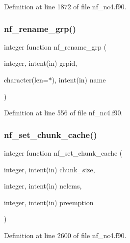 Definition at line 1872 of file nf\+\_\+nc4.\+f90.

\mbox{\label{nf__nc4_8f90_a64a1b89a08cbc89ad5360cfb2d17996c}} 
\subsubsection{\texorpdfstring{nf\+\_\+rename\+\_\+grp()}{nf\_rename\_grp()}}
{\footnotesize\ttfamily integer function nf\+\_\+rename\+\_\+grp (\begin{DoxyParamCaption}\item[{integer, intent(in)}]{grpid,  }\item[{character(len=$\ast$), intent(in)}]{name }\end{DoxyParamCaption})}



Definition at line 556 of file nf\+\_\+nc4.\+f90.

\mbox{\label{nf__nc4_8f90_a9aecb7b5d039a8ba5ad9ae15d7aedce3}} 
\subsubsection{\texorpdfstring{nf\+\_\+set\+\_\+chunk\+\_\+cache()}{nf\_set\_chunk\_cache()}}
{\footnotesize\ttfamily integer function nf\+\_\+set\+\_\+chunk\+\_\+cache (\begin{DoxyParamCaption}\item[{integer, intent(in)}]{chunk\+\_\+size,  }\item[{integer, intent(in)}]{nelems,  }\item[{integer, intent(in)}]{preemption }\end{DoxyParamCaption})}



Definition at line 2600 of file nf\+\_\+nc4.\+f90.

\mbox{\label{nf__nc4_8f90_a3eb7bc91ef81ef9a52261f647e4df754}} 
